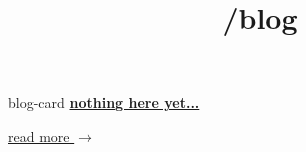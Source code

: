 \documentclass{article}
\title{/blog}
\author{}
\date{}
\newcommand{\BlogCard}[3]{%
  \begin{BlockClass}{blog-card}
    \textbf{\href{#1}{#2}}
    \medskip

    #3

    \medskip
    \href{#1}{read more $\rightarrow$}
  \end{BlockClass}
}
\begin{document}

\maketitle

\BlogCard
  {/blog/}
  {nothing here yet...}
  {}

\end{document}

